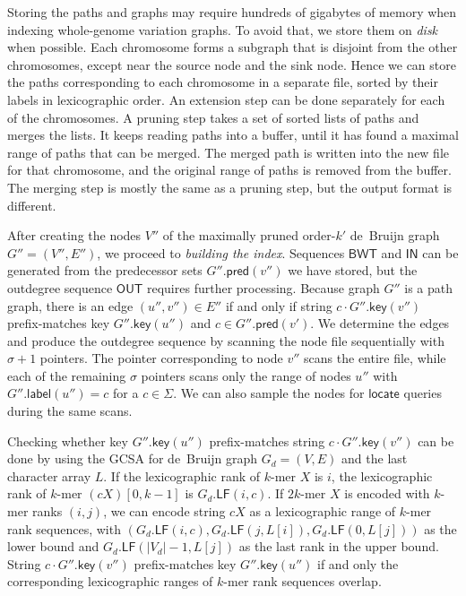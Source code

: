 \documentclass[a4paper,UKenglish]{lipics-v2016}
\newcommand{\abs}[1]{\ensuremath{\lvert #1 \rvert}}
\newcommand{\LF}{\ensuremath{\mathsf{LF}}}
\newcommand{\locate}{\ensuremath{\mathsf{locate}}}
\newcommand{\glabel}{\ensuremath{\mathsf{label}}}
\newcommand{\gpred}{\ensuremath{\mathsf{pred}}}
\newcommand{\gkey}{\ensuremath{\mathsf{key}}}
\newcommand{\kmer}[1]{$#1$\nobreakdash-mer}
\newcommand{\orderk}[1]{order\nobreakdash-$#1$}
\newcommand{\BWT}{\ensuremath{\mathsf{BWT}}}
\newcommand{\bvIN}{\ensuremath{\mathsf{IN}}}
\newcommand{\bvOUT}{\ensuremath{\mathsf{OUT}}}
\begin{document}
Storing the paths and graphs may require hundreds of gigabytes of memory when indexing whole-genome variation graphs. To avoid that, we store them on \emph{disk} when possible. Each chromosome forms a subgraph that is disjoint from the other chromosomes, except near the source node and the sink node. Hence we can store the paths corresponding to each chromosome in a separate file, sorted by their labels in lexicographic order. An extension step can be done separately for each of the chromosomes. A pruning step takes a set of sorted lists of paths and merges the lists. It keeps reading paths into a buffer, until it has found a maximal range of paths that can be merged. The merged path is written into the new file for that chromosome, and the original range of paths is removed from the buffer. The merging step is mostly the same as a pruning step, but the output format is different.

After creating the nodes $V''$ of the maximally pruned \orderk{k'} de~Bruijn graph $G'' = (V'', E'')$, we proceed to \emph{building the index}. Sequences $\BWT$ and $\bvIN$ can be generated from the predecessor sets $G''.\gpred(v'')$ we have stored, but the outdegree sequence $\bvOUT$ requires further processing. Because graph $G''$ is a path graph, there is an edge $(u'', v'') \in E''$ if and only if string $c \cdot G''.\gkey(v'')$ prefix-matches key $G''.\gkey(u'')$ and $c \in G''.\gpred(v')$. We determine the edges and produce the outdegree sequence by scanning the node file sequentially with $\sigma+1$ pointers. The pointer corresponding to node $v''$ scans the entire file, while each of the remaining $\sigma$ pointers scans only the range of nodes $u''$ with $G''.\glabel(u'') = c$ for a $c \in \Sigma$. We can also sample the nodes for $\locate$ queries during the same scans.

Checking whether key $G''.\gkey(u'')$ prefix-matches string $c \cdot G''.\gkey(v'')$ can be done by using the GCSA for de~Bruijn graph $G_{d} = (V, E)$ and the last character array $L$. If the lexicographic rank of \kmer{k} $X$ is $i$, the lexicographic rank of \kmer{k} $(cX)[0, k-1]$ is $G_{d}.\LF(i, c)$. If \kmer{2k} $X$ is encoded with \kmer{k} ranks $(i, j)$, we can encode string $cX$ as a lexicographic range of \kmer{k} rank sequences, with $(G_{d}.\LF(i, c), G_{d}.\LF(j, L[i]), G_{d}.\LF(0, L[j]))$ as the lower bound and $G_{d}.\LF(\abs{V_{d}}-1, L[j])$ as the last rank in the upper bound. String $c \cdot G''.\gkey(v'')$ prefix-matches key $G''.\gkey(u'')$ if and only the corresponding lexicographic ranges of \kmer{k} rank sequences overlap.
\end{document}
